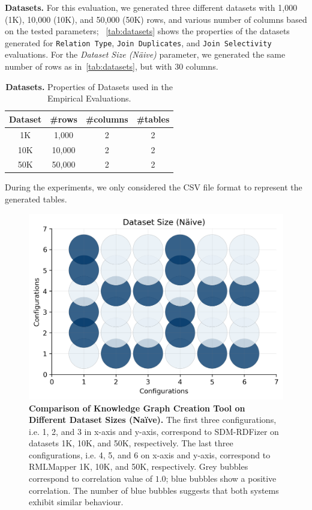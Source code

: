 \noindent \textbf{Datasets.}
For this evaluation, we generated three different datasets with 1,000 (1K), 10,000 (10K), and 50,000 (50K) rows, and various number of columns based on the tested parameters; ~\autoref{tab:datasets} shows the properties of the datasets generated for \texttt{Relation Type}, \texttt{Join Duplicates}, and \texttt{Join Selectivity} evaluations. 
For the \textit{Dataset Size (N{\"a}ive)} parameter, we generated the same number of rows as in~\autoref{tab:datasets}, but with $30$ columns.
\begin{table}[!tb]
    \centering
    \caption{\textbf{Datasets.} Properties of Datasets used in the Empirical Evaluations.}
    \label{tab:datasets}
    \begin{tabular}{|c|c|c|c|}
    \hline
     Dataset & \#rows & \#columns & \#tables \\ \hline
     1K & 1,000 & 2 & 2 \\ \hline 
     10K & 10,000 & 2 & 2 \\ \hline 
     50K & 50,000 & 2 & 2 \\ \hline 
     \end{tabular}
\end{table}
%
During the experiments, we only considered the CSV file format to represent the generated tables.

\begin{figure}[!tb]
    \centering
    \includegraphics[width=0.8\columnwidth]{figures/naive_allk_bubble.png}
    \caption{\textbf{Comparison of Knowledge Graph Creation Tool on Different Dataset Sizes (Na{\"i}ve).} The first three configurations, i.e. 1, 2, and 3 in x-axis and y-axis, correspond to SDM-RDFizer on datasets 1K, 10K, and 50K, respectively. The last three configurations, i.e. 4, 5, and 6 on x-axis and y-axis, correspond to RMLMapper 1K, 10K, and 50K, respectively. Grey bubbles correspond to correlation value of $1.0$; blue bubbles show a positive correlation. The number of blue bubbles suggests that both systems exhibit similar behaviour.}
    \label{fig:naive_bubble}
\end{figure}

